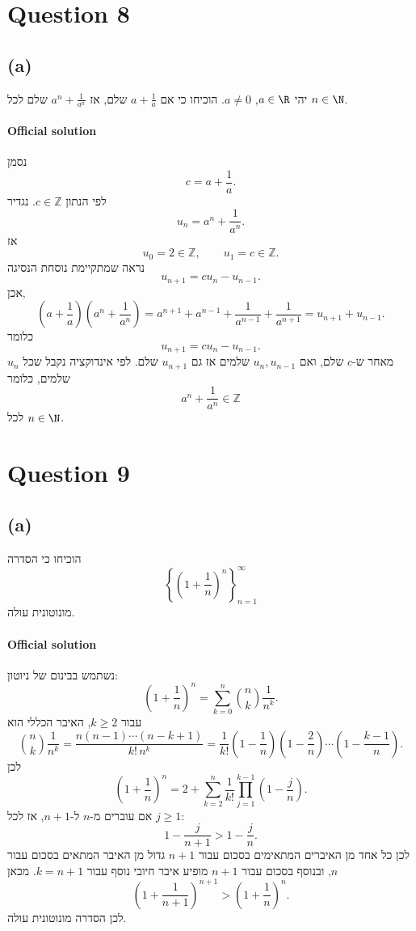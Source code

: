 \documentclass[12pt]{article}
\begin{document}
\section*{Question 8}

\subsection*{(a)}
יהי \(a\in\R\), \(a\ne0\). הוכיחו כי אם \(a+\frac1a\) שלם, אז \(a^n+\frac1{a^n}\) שלם לכל \(n\in\N\).

\paragraph{Official solution}
נסמן
\[
c=a+\frac1a.
\]
לפי הנתון \(c\in\mathbb{Z}\). נגדיר
\[
u_n=a^n+\frac1{a^n}.
\]
אז
\[
u_0=2\in\mathbb{Z},\qquad u_1=c\in\mathbb{Z}.
\]
נראה שמתקיימת נוסחת הנסיגה
\[
u_{n+1}=cu_n-u_{n-1}.
\]
אכן,
\[
\left(a+\frac1a\right)\left(a^n+\frac1{a^n}\right)
=a^{n+1}+a^{n-1}+\frac1{a^{n-1}}+\frac1{a^{n+1}}
=u_{n+1}+u_{n-1}.
\]
כלומר
\[
u_{n+1}=cu_n-u_{n-1}.
\]
מאחר ש-\(c\) שלם, ואם \(u_n,u_{n-1}\) שלמים אז גם \(u_{n+1}\) שלם. לפי אינדוקציה נקבל שכל \(u_n\) שלמים, כלומר
\[
a^n+\frac1{a^n}\in\mathbb{Z}
\]
לכל \(n\in\N\).


\section*{Question 9}

\subsection*{(a)}
הוכיחו כי הסדרה
\[
\left\{\left(1+\frac1n\right)^n\right\}_{n=1}^{\infty}
\]
מונוטונית עולה.

\paragraph{Official solution}
נשתמש בבינום של ניוטון:
\[
\left(1+\frac1n\right)^n
=\sum_{k=0}^n \binom{n}{k}\frac1{n^k}.
\]
עבור \(k\ge2\), האיבר הכללי הוא
\[
\binom{n}{k}\frac1{n^k}
=\frac{n(n-1)\cdots(n-k+1)}{k!\,n^k}
=\frac1{k!}\left(1-\frac1n\right)\left(1-\frac2n\right)\cdots\left(1-\frac{k-1}{n}\right).
\]
לכן
\[
\left(1+\frac1n\right)^n
=2+\sum_{k=2}^n \frac1{k!}\prod_{j=1}^{k-1}\left(1-\frac{j}{n}\right).
\]
אם עוברים מ-\(n\) ל-\(n+1\), אז לכל \(j\ge1\):
\[
1-\frac{j}{n+1}>1-\frac{j}{n}.
\]
לכן כל אחד מן האיברים המתאימים בסכום עבור \(n+1\) גדול מן האיבר המתאים בסכום עבור \(n\), ובנוסף בסכום עבור \(n+1\) מופיע איבר חיובי נוסף עבור \(k=n+1\). מכאן
\[
\left(1+\frac1{n+1}\right)^{n+1}>
\left(1+\frac1n\right)^n.
\]
לכן הסדרה מונוטונית עולה.
\end{document}
